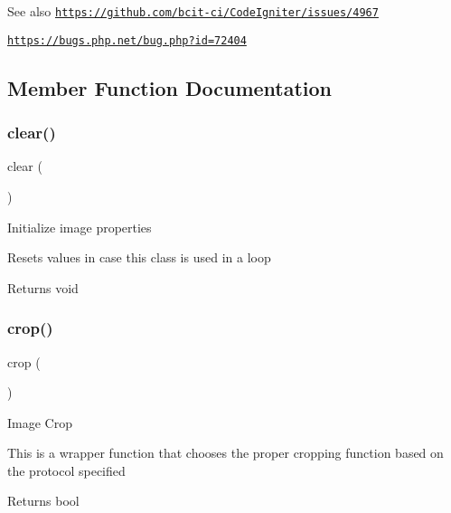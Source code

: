\begin{DoxySeeAlso}{See also}
\href{https://github.com/bcit-ci/CodeIgniter/issues/4967}{\tt https\+://github.\+com/bcit-\/ci/\+Code\+Igniter/issues/4967} 

\href{https://bugs.php.net/bug.php?id=72404}{\tt https\+://bugs.\+php.\+net/bug.\+php?id=72404}
\end{DoxySeeAlso}


\subsection{Member Function Documentation}
\mbox{\label{class_c_i___image__lib_aa821bec12eaa7e0f649397c9675ff505}} 
\subsubsection{\texorpdfstring{clear()}{clear()}}
{\footnotesize\ttfamily clear (\begin{DoxyParamCaption}{ }\end{DoxyParamCaption})}

Initialize image properties

Resets values in case this class is used in a loop

\begin{DoxyReturn}{Returns}
void 
\end{DoxyReturn}
\mbox{\label{class_c_i___image__lib_a77248c0134d1b117eb36774ecee6e04c}} 
\subsubsection{\texorpdfstring{crop()}{crop()}}
{\footnotesize\ttfamily crop (\begin{DoxyParamCaption}{ }\end{DoxyParamCaption})}

Image Crop

This is a wrapper function that chooses the proper cropping function based on the protocol specified

\begin{DoxyReturn}{Returns}
bool 
\end{DoxyReturn}
\mbox{\label{class_c_i___image__lib_a71a6f2e6d97ff5347257f101002bc903}} 

